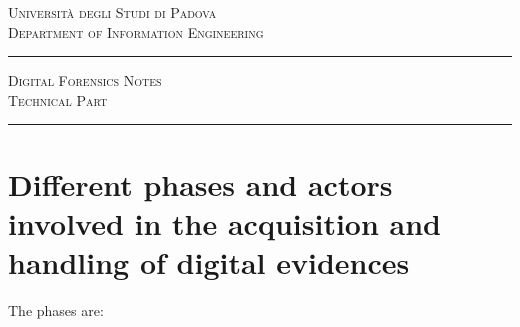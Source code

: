 \documentclass[a4paper, 12pt]{article}
\begin{document}
\vspace*{1cm}

\begin{center}
\large \textsc{Università degli Studi di Padova \\ Department of Information Engineering}

\rule{\linewidth}{1pt} \Huge{ \textsc{Digital Forensics Notes \\ Technical Part}} \rule{\linewidth}{2pt}

\end{center}

\section{Different phases and actors involved in the acquisition and handling of digital evidences}
The phases are:
\end{document}
